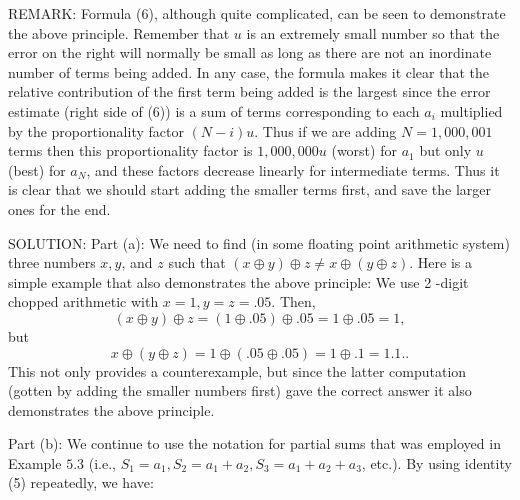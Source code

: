 \documentclass[../main.tex]{subfiles}
\begin{document}
REMARK: Formula (6), although quite complicated, can be seen to demonstrate the above principle. Remember that $u$ is an extremely small number so that the error on the right will normally be small as long as there are not an inordinate number of terms being added. In any case, the formula makes it clear that the relative contribution of the first term being added is the largest since the error estimate (right side of (6)) is a sum of terms corresponding to each $a_{i}$ multiplied by the proportionality factor $(N-i) u$. Thus if we are adding $N=1,000,001$ terms then this proportionality factor is $1,000,000 u$ (worst) for $a_{1}$ but only $u$ (best) for $a_{N}$, and these factors decrease linearly for intermediate terms. Thus it is clear that we should start adding the smaller terms first, and save the larger ones for the end.

SOLUTION: Part (a): We need to find (in some floating point arithmetic system) three numbers $x, y$, and $z$ such that $(x \oplus y) \oplus z \neq x \oplus(y \oplus z)$. Here is a simple example that also demonstrates the above principle: We use 2 -digit chopped arithmetic with $x=1, y=z=.05$. Then,
$$
(x \oplus y) \oplus z=(1 \oplus .05) \oplus .05=1 \oplus .05=1,
$$
but
$$
x \oplus(y \oplus z)=1 \oplus(.05 \oplus .05)=1 \oplus .1=1.1 . .
$$
This not only provides a counterexample, but since the latter computation (gotten by adding the smaller numbers first) gave the correct answer it also demonstrates the above principle.

Part (b): We continue to use the notation for partial sums that was employed in Example $5.3$ (i.e., $S_{1}=a_{1}, S_{2}=a_{1}+a_{2}, S_{3}=a_{1}+a_{2}+a_{3}$, etc.). By using identity (5) repeatedly, we have:
\end{document}
